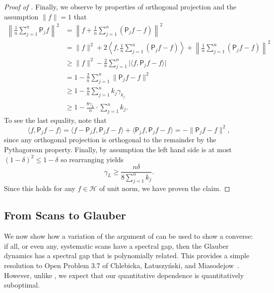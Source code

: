 \documentclass[11pt]{article}
\begin{document}
\begin{proof}[Proof of ]
Finally, we observe by properties of orthogonal projection and the assumption $\|f\|=1$ that
\begin{align*}
    \left\| \frac{1}{n}\sum_{j=1}^n \mathsf{P}_jf\right\|^2&=\left\|f+ \frac{1}{n}\sum_{j=1}^n (\mathsf{P}_jf-f)\right\|^2\\
    &=\|f\|^2+2\left\langle f,\frac{1}{n}\sum_{j=1}^n (\mathsf{P}_jf-f)\right\rangle+\left\|\frac{1}{n}\sum_{j=1}^n (\mathsf{P}_jf-f)\right\|^2\\
    &\geq \|f\|^2-\frac{2}{n}\sum_{j=1}^n \vert \langle f,\mathsf{P}_jf-f\rangle\vert\\
    &=1-\frac{2}{n}\sum_{j=1}^n \|\mathsf{P}_jf-f\|^2\\
    &\geq 1-\frac{8}{n}\sum_{j=1}^n k_j\gamma_{k_j}\\
    &\geq 1-\frac{8\gamma_{L}}{n}\cdot \sum_{j=1}^n k_j.
\end{align*}
To see the last equality, note that
\begin{equation*}
    \langle f,\mathsf{P}_jf-f\rangle = \langle f-\mathsf{P}_jf,\mathsf{P}_jf-f\rangle+ \langle\mathsf{P}_jf,\mathsf{P}_jf-f\rangle = -\|\mathsf{P}_jf-f\|^2,
\end{equation*}
since any orthogonal projection is orthogonal to the remainder by the Pythagorean property.
Finally, by assumption the left hand side is at most $(1-\delta)^2\leq 1-\delta$ so rearranging yields
\begin{equation*}
    \gamma_{L} \geq \frac{n\delta}{8\sum_{j=1}^n k_j}.
\end{equation*}
Since this holds for any $f\in \mathcal{H}$ of unit norm, we have proven the claim.
\end{proof}

\subsection{From Scans to Glauber}

We now show how a variation of the argument of  can be used to show a converse: if all, or even any, systematic scans have a spectral gap, then the Glauber dynamics has a spectral gap that is polynomially related. This provides a simple resolution to Open Problem 3.7 of Chlebicka,  Łatuszy\'nski, and Miasodejow~\cite{chlebicka}. However, unlike , we expect that our quantitative dependence is quantitatively suboptimal.
\end{document}
